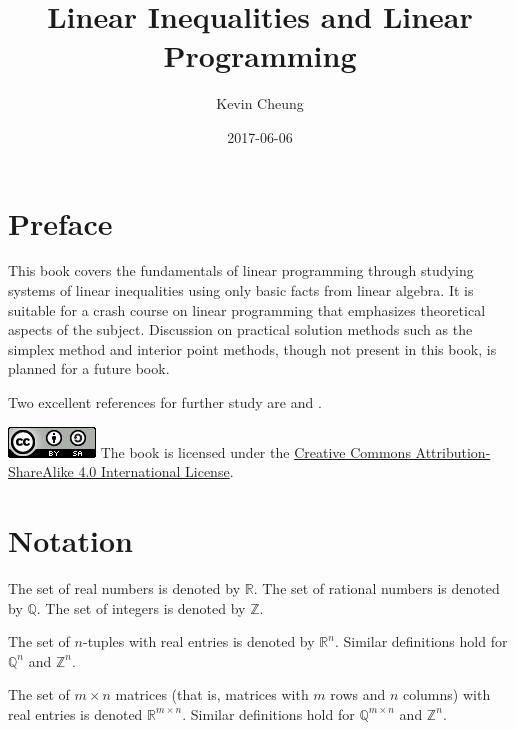 \documentclass[]{book}
\title{Linear Inequalities and Linear Programming}
\author{Kevin Cheung}
\date{2017-06-06}
\newcommand{\NN}{\mathbb{N}}
\newcommand{\ZZ}{\mathbb{Z}}
\newcommand{\QQ}{\mathbb{Q}}
\newcommand{\RR}{\mathbb{R}}
\newcommand{\ssep}{~:~}
\newcommand{\T}{\mathsf{T}}
\newcommand{\mm}[1]{\mathbf{#1}}
\renewcommand{\vec}[1]{\mathbf{#1}}
\theoremstyle{definition}
\theoremstyle{definition}
\theoremstyle{remark}
\begin{document}
\maketitle

{
\setcounter{tocdepth}{1}
\tableofcontents
}
\renewcommand{\NN}{\mathbb{N}}
\renewcommand{\ZZ}{\mathbb{Z}}
\renewcommand{\QQ}{\mathbb{Q}}
\renewcommand{\RR}{\mathbb{R}}
\renewcommand{\ssep}{~:~}
\renewcommand{\T}{\mathsf{T}}
\renewcommand{\qed}{\square}

\renewcommand{\mm}[1]{\mathbf{#1}}

\renewcommand{\vec}[1]{\mathbf{#1}}

\chapter*{Preface}\label{preface}

This book covers the fundamentals of linear programming through studying
systems of linear inequalities using only basic facts from linear
algebra. It is suitable for a crash course on linear programming that
emphasizes theoretical aspects of the subject. Discussion on practical
solution methods such as the simplex method and interior point methods,
though not present in this book, is planned for a future book.

Two excellent references for further study are \citet{Bertsimas:1997}
and \citet{Schrijver:1986}.

\includegraphics{images/by-sa.png} The book is licensed under the
\href{http://creativecommons.org/licenses/by-sa/4.0/}{Creative Commons
Attribution-ShareAlike 4.0 International License}.

\chapter*{Notation}\label{notation}

The set of real numbers is denoted by \(\RR\). The set of rational
numbers is denoted by \(\QQ\). The set of integers is denoted by
\(\ZZ\).

The set of \(n\)-tuples with real entries is denoted by \(\RR^n\).
Similar definitions hold for \(\QQ^n\) and \(\ZZ^n\).

The set of \(m\times n\) matrices (that is, matrices with \(m\) rows and
\(n\) columns) with real entries is denoted \(\RR^{m \times n}\).
Similar definitions hold for \(\QQ^{m\times n}\) and \(\ZZ^n\).
\end{document}
